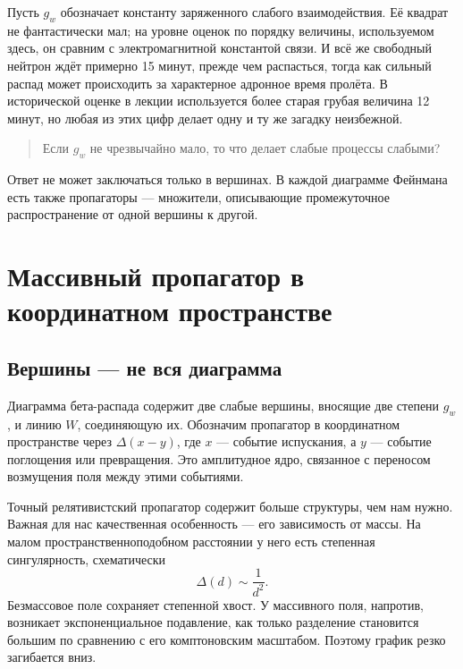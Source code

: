 Пусть \(g_w\) обозначает константу заряженного слабого взаимодействия. Её квадрат не фантастически мал; на уровне оценок по порядку величины, используемом здесь, он сравним с электромагнитной константой связи. И всё же свободный нейтрон ждёт примерно 15 минут, прежде чем распасться, тогда как сильный распад может происходить за характерное адронное время пролёта. В исторической оценке в лекции используется более старая грубая величина 12 минут, но любая из этих цифр делает одну и ту же загадку неизбежной.
\begin{quote}
Если \(g_w\) не чрезвычайно мало, то что делает слабые процессы слабыми?
\end{quote}

Ответ не может заключаться только в вершинах. В каждой диаграмме Фейнмана есть также пропагаторы — множители, описывающие промежуточное распространение от одной вершины к другой.

\section{Массивный пропагатор в координатном пространстве}

\subsection{Вершины — не вся диаграмма}

Диаграмма бета-распада содержит две слабые вершины, вносящие две степени \(g_w\), и линию \(W\), соединяющую их. Обозначим пропагатор в координатном пространстве через \(\Delta(x-y)\), где \(x\) — событие испускания, а \(y\) — событие поглощения или превращения. Это амплитудное ядро, связанное с переносом возмущения поля между этими событиями.

Точный релятивистский пропагатор содержит больше структуры, чем нам нужно. Важная для нас качественная особенность — его зависимость от массы. На малом пространственноподобном расстоянии у него есть степенная сингулярность, схематически
\begin{equation}
  \Delta(d)\sim\frac1{d^2}.
\end{equation}
Безмассовое поле сохраняет степенной хвост. У массивного поля, напротив, возникает экспоненциальное подавление, как только разделение становится большим по сравнению с его комптоновским масштабом. Поэтому график резко загибается вниз.

